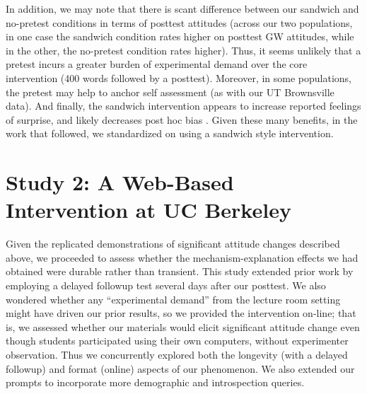 

In addition, we may note that there is scant difference between our sandwich and
no-pretest conditions in terms of posttest attitudes (across our two
populations, in one case the sandwich condition rates higher on posttest GW
attitudes, while in the other, the no-pretest condition rates higher). Thus, it
seems unlikely that a pretest incurs a greater burden of experimental demand
over the core intervention (400 words followed by a posttest). Moreover, in some
populations, the pretest may help to anchor self assessment (as with our UT
Brownsville data). And finally, the sandwich intervention appears to increase
reported feelings of surprise, and likely decreases post hoc bias
\parencite{rinne_estimation_2006}. Given these many benefits, in the work that
followed, we standardized on using a sandwich style intervention.

\section{Study 2: A Web-Based Intervention at UC Berkeley}
\label{sec:mech-uc-online}

Given the replicated demonstrations of significant attitude changes described
above, we proceeded to assess whether the mechanism-explanation effects we had
obtained were durable rather than transient. This study extended prior work by
employing a delayed followup test several days after our posttest. We also wondered
whether any ``experimental demand'' from the lecture room setting might have driven
our prior results, so we provided the intervention on-line; that is, we assessed
whether our materials would elicit significant attitude change even though
students participated using their own computers, without experimenter observation.
Thus we concurrently explored both  the longevity (with a delayed followup) and format
(online) aspects of our phenomenon. We also extended our prompts to incorporate
more demographic and introspection queries.

